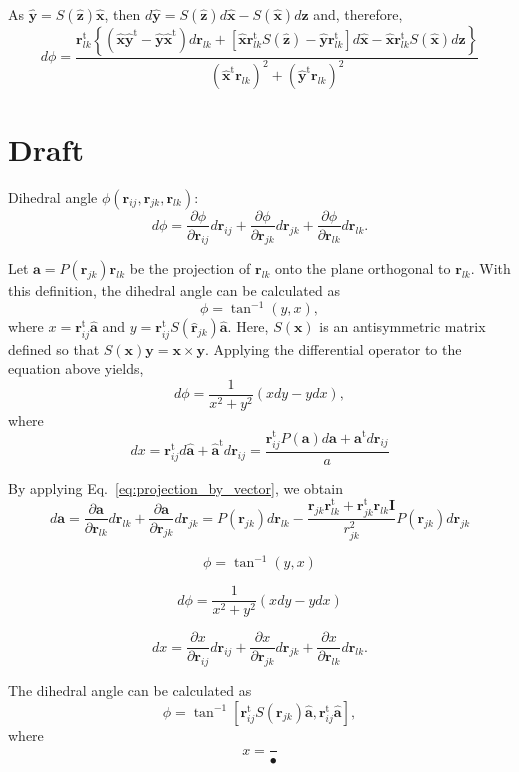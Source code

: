 \documentclass[11pt]{article}
\newcommand{\mt}[1]{\boldsymbol{\mathbf{#1}}}           %
\newcommand{\vt}[1]{\boldsymbol{\mathbf{#1}}}           %
\newcommand{\tr}[1]{#1^\text{t}}                        %
\newcommand{\diff}[2]{\frac{\partial #1}{\partial #2}}  %
\begin{document}
As $\hat{\vt y} = S(\hat{\vt z})\hat{\vt x}$, then $d\hat{\vt y} = S(\hat{\vt z})d\hat{\vt x} - S(\hat{\vt x})d\hat{\vt z}$ and, therefore,
\[
d\phi = \frac{ \tr{{\vt r}_{lk}}\left\{(\hat{\vt x}\tr{\hat{\vt y}} - \hat{\vt y}\tr{\hat{\vt x}})d{\vt r}_{lk} + [\hat{\vt x}\tr{{\vt r}_{lk}} S(\hat{\vt z}) - \hat{\vt y}\tr{{\vt r}_{lk}}]d\hat{\vt x} - \hat{\vt x}\tr{{\vt r}_{lk}} S(\hat{\vt x})d\hat{\vt z} \right\}}{(\tr{\hat{\vt x}}{\vt r}_{lk})^2 + (\tr{\hat{\vt y}}{\vt r}_{lk})^2}
\]


\section{Draft}

Dihedral angle $\phi({\vt r}_{ij},{\vt r}_{jk},{\vt r}_{lk})$:
\begin{equation}
d\phi = \diff{\phi}{{\vt r}_{ij}}d{\vt r}_{ij} + \diff{\phi}{{\vt r}_{jk}}d{\vt r}_{jk} + \diff{\phi}{{\vt r}_{lk}}d{\vt r}_{lk}.
\end{equation}

Let $\vt a = P({\vt r}_{jk}){\vt r}_{lk}$ be the projection of ${\vt r}_{lk}$ onto the plane orthogonal to ${\vt r}_{lk}$. With this definition, the dihedral angle can be calculated as
\[
\phi = \tan^{-1}(y,x),
\]
where $x = \tr{\vt r}_{ij} \hat{\vt a}$ and $y = \tr{\vt r}_{ij} S(\hat{\vt r}_{jk}) \hat{\vt a}$. Here, $S(\vt x)$ is an antisymmetric matrix defined so that $S(\vt x)\vt y = \vt x \times \vt y$. Applying the differential operator to the equation above yields,
\[
d\phi = \frac{1}{x^2 + y^2} (x dy - y dx),
\]
where
\[
dx = \tr{\vt r}_{ij} d\hat{\vt a} + \tr{\hat{\vt a}} d{\vt r}_{ij} = \frac{\tr{\vt r}_{ij} P(\vt a)d{\vt a} + \tr{\vt a} d{\vt r}_{ij}}{a}
\]


 By applying Eq.~\ref{eq:projection_by_vector}, we obtain
\[
d{\vt a} = \diff{\vt a}{{\vt r}_{lk}}d{{\vt r}_{lk}} + \diff{\vt a}{{\vt r}_{jk}}d{{\vt r}_{jk}} = P({\vt r}_{jk})d{{\vt r}_{lk}} - \frac{{\vt r}_{jk} \tr{{\vt r}_{lk}} + \tr{{\vt r}_{jk}} {\vt r}_{lk} \mt I}{r_{jk}^2} P({\vt r}_{jk})d{\vt r}_{jk}
\]

\[
\phi = \tan^{-1}(y,x)
\]

\[
d\phi = \frac{1}{x^2 + y^2} (x dy - y dx)
\]

\[
dx = \diff{x}{{\vt r}_{ij}}d{\vt r}_{ij} + \diff{x}{{\vt r}_{jk}}d{\vt r}_{jk} + \diff{x}{{\vt r}_{lk}}d{\vt r}_{lk}.
\]

The dihedral angle can be calculated as
\begin{equation}
\phi = \tan^{-1}\left[\tr{\vt r}_{ij} S({\vt r}_{jk}) \hat{\vt a},\tr{\vt r}_{ij} \hat{\vt a}\right],
\end{equation}
where
\[
x = \frac{}{•}
\]
\end{document}
